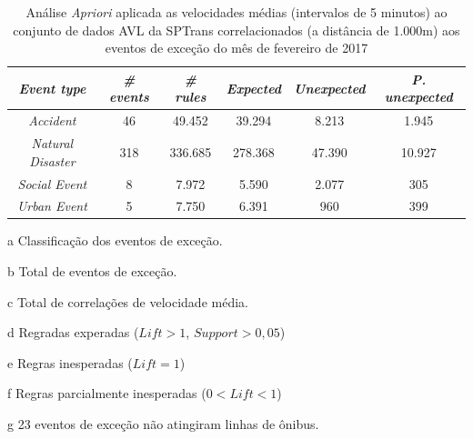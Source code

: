 \documentclass[
	12pt,				%
	oneside,			%
	a4paper,			%
	english,			%
	brazil				%
	]{abntex2ppgsi}
\begin{document}
{{\begin{apendicesenv}
\begin{table}[!htb]
\centering
\begin{threeparttable}
\caption {Análise \textit{Apriori} aplicada as velocidades médias (intervalos de 5 minutos) ao conjunto de dados AVL da SPTrans correlacionados (a distância de 1.000m) aos eventos de exceção do mês de fevereiro de 2017}
\label {tab:aprioriFull}
\begin{tabular}{c|c|c|c|c|c}
\hline
\textbf{\textit{Event type}}\tnote{a} & \textbf{\textit{\# events}}\tnote{b} & \textit{\textbf{\# rules}}\tnote{c} & \textbf{\textit{Expected}}\tnote{d} & \textbf{\textit{Unexpected}}\tnote{e} & \textbf{\textit{P. unexpected}}\tnote{f}   \\
\hline
\textit{Accident} & 46 & 49.452 & 39.294 & 8.213 & 1.945 \\
\textit{Natural Disaster} & 318 & 336.685 & 278.368 & 47.390 & 10.927 \\
\textit{Social Event} & 8 & 7.972 & 5.590 & 2.077 & 305 \\
\textit{Urban Event} & 5 & 7.750 & 6.391 & 960 & 399 \\
\hline
\end{tabular}
\begin{tablenotes}
            \item[a] Classificação dos eventos de exceção.
            \item[b] Total de eventos de exceção.
            \item[c] Total de correlações de velocidade média.
            \item[d] Regradas experadas ($Lift > 1$, $Support > 0,05$)
            \item[e] Regras inesperadas ($Lift = 1$)
            \item[f] Regras parcialmente inesperadas ($0 < Lift < 1$)
            \item[g] 23 eventos de exceção não atingiram linhas de ônibus.
        \end{tablenotes}
\end{threeparttable}
\end{table}


\end{apendicesenv}}}
\end{document}
